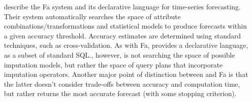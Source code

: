 \textcite*{duan2007processing} describe the Fa system and its declarative language for time-series forecasting. Their
system automatically searches the space of attribute combinations/transformations and statistical models
to produce forecasts within a given accuracy threshold. Accuracy estimates are determined using
standard techniques, such as cross-validation. 
As with Fa, \ProjectName{} provides a declarative language, as
a subset of standard SQL.\@ \ProjectName{}, however, is not searching the space of possible
imputation models, but rather the space of query plans that incorporate imputation operators. Another major point
of distinction between \ProjectName{} and Fa is that the latter doesn't consider trade-offs between accuracy and computation time, but rather returns the most accurate forecast (with some stopping criterion).



